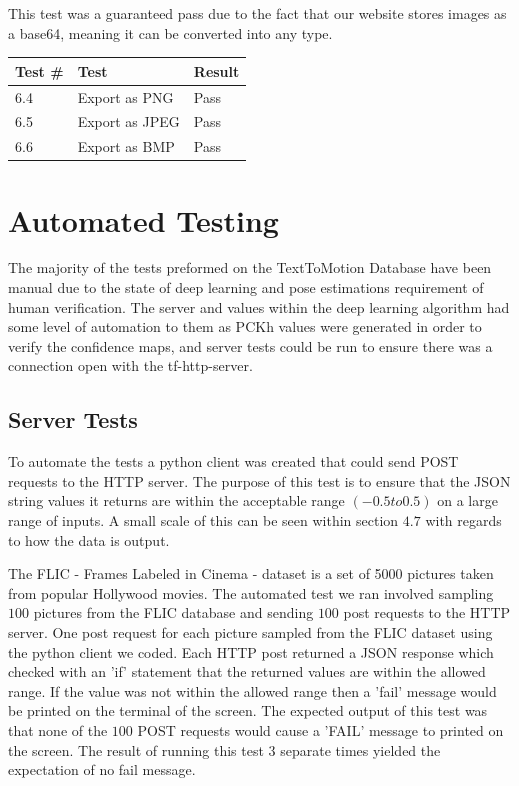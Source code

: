 \documentclass{scrreprt}
\begin{document}
This test was a guaranteed pass due to the fact that our website stores images
as a base64, meaning it can be converted into any type.

\begin{table}[H]
        \centering
        \begin{tabular}{||p{0.75cm}|p{4cm}|p{2.5cm}||}
                \hline
                \textbf Test \# & \textbf Test & \textbf Result\\
                \hline\hline
                6.4 & Export as PNG & Pass \\ %
                \hline
                6.5 & Export as JPEG & Pass \\ %
                \hline
                6.6 & Export as BMP & Pass \\ %
                \hline
        \end{tabular}
\end{table}

\chapter{Automated Testing}

The majority of the tests preformed on the TextToMotion Database have been manual due to the state of deep learning and pose estimations requirement of human verification. The server and values within the deep learning algorithm had some level of automation to them as PCKh values were generated in order to verify the confidence maps, and server tests could be run to ensure there was a connection open with the tf-http-server.

\section{Server Tests}

To automate the tests a python client was created that could send POST requests to the HTTP server.  The purpose of this test is to ensure that the JSON string values it returns are within the acceptable range $\left(-0.5 to 0.5\right)$ on a large range of inputs. A small scale of this can be seen within section $4.7$ with regards to how the data is output.

The FLIC - Frames Labeled in Cinema - dataset is a set of 5000 pictures taken from popular Hollywood movies.  The automated test we ran involved sampling $100$ pictures from the FLIC database and sending $100$ post requests to the HTTP server.  One post request for each picture sampled from the FLIC dataset using the python client we coded.  Each HTTP post returned a JSON response which checked with an 'if' statement that the returned values are within the allowed range.  If the value was not within the allowed range then a 'fail' message would be printed on the terminal of the screen. The expected output of this test was that none of the $100$ POST requests would cause a 'FAIL' message to printed on the screen.  The result of running this test $3$ separate times yielded the expectation of no fail message.
\end{document}
